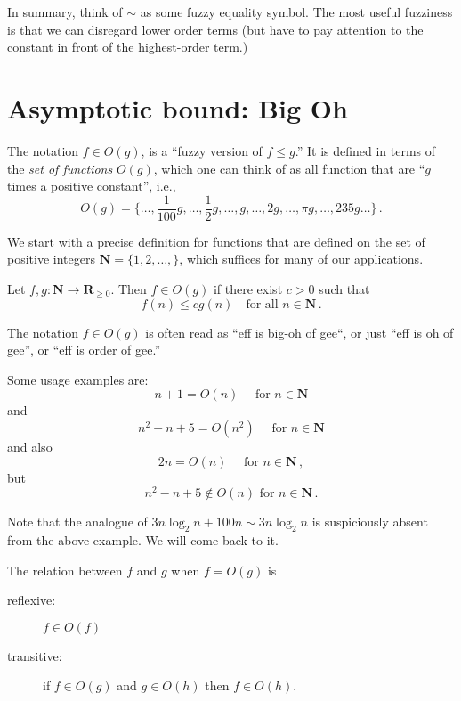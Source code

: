 \documentclass{tstextbook}
\begin{document}
In summary, think of \(\sim\) as some fuzzy equality symbol.
The most useful fuzziness is that we can disregard lower order terms (but have to pay attention to the constant in front of the highest-order term.)


\section{Asymptotic bound: Big Oh}

The notation \(f\in O(g) \), is a “fuzzy version of \(f\leq g\).”
It is defined in terms of the \emph{set of functions} $O(g)$, which one can think of as all function that are ``$g$ times a positive constant'', i.e., 
\[ O(g) = \{ \ldots, \frac{1}{100}g, \ldots,\frac12g, \ldots,g, \ldots,2g, \ldots,\pi g, \ldots,235g\ldots\}\,.\]

We start with a precise definition for functions that are defined on the set of positive integers $\mathbf N =\{1,2,\ldots, \}$, which suffices for many of our applications.
\begin{definition}
  Let $f, g\colon \mathbf N\rightarrow\mathbf R_{\geq 0}$.
  Then $f \in O(g)$ if there exist $c>0$ such that
  \[ f(n)\leq cg(n)\quad\text{for all $n\in \mathbf N$}\,. \]
\end{definition}

The notation \(f \in O(g)\) is often read as “eff is big-oh of gee“, or just “eff is oh of gee”, or “eff is order of  gee.'' 

\begin{example}
Some usage examples are:
  \[ n + 1 =O(n) \quad\text{ for $n\in\mathbf N$}\]
  and
  \[ n^2 -n + 5 =O(n^2) \quad\text{ for $n\in\mathbf N$}\]
and also
\[ 2n =O ( n) \quad\text{ for $n\in\mathbf N$}\,,\]
but  
\[ n^2 - n + 5 \notin O(n) \text{ for $n\in\mathbf N$}\,. \] 
\end{example}

Note that the analogue of $3n\log_2 n + 100 n\sim 3 n\log_2 n$ is suspiciously absent from the above example.
We will come back to it.


\begin{theorem}[as a relation]
  \label{thm: Oh as a relation}
The relation between \(f\) and \(g\) when \(f=O(g)\) is
  \begin{description}
    \item[reflexive:] \( f \in O(f)\)
    \item[transitive:] if \( f\in O( g)\) and \(g\in O(h)\) then \(f\in O( h)\).
  \end{description}
\end{theorem}
\end{document}
